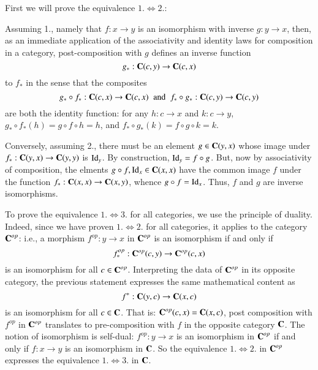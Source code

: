 \documentclass[12pt]{report}
\begin{document}
\begin{proof*}{}{}
    First we will prove the equivalence $1. \iff 2.$:

    Assuming 1., namely that $f:x\rightarrow y$ is an isomorphism with inverse $g:y\rightarrow x$, then, as an immediate application of the associativity and identity laws for composition in a category, post-composition with $g$ defines an inverse function \begin{equation*}
        g_*:\normalfont\textbf{C}(c,y)\rightarrow \normalfont\textbf{C}(c,x)
    \end{equation*}
    to $f_*$ in the sense that the composites \begin{equation*}
        g_*\circ f_*:\normalfont\textbf{C}(c,x)\rightarrow \normalfont\textbf{C}(c,x)\;\;\text{and}\;\;f_*\circ g_*:\normalfont\textbf{C}(c,y)\rightarrow \normalfont\textbf{C}(c,y)
    \end{equation*}
    are both the identity function: for any $h:c\rightarrow x$ and $k:c\rightarrow y$, $g_*\circ f_*(h) = g\circ f\circ h = h$, and $f_*\circ g_*(k) = f\circ g \circ k = k$.

    Conversely, assuming 2., there must be an element $g \in \normalfont\textbf{C}(y,x)$ whose image under $f_*:\normalfont\textbf{C}(y,x)\rightarrow \normalfont\textbf{C}(y,y)$ is $\operatorname{Id}_y$. By construction, $\operatorname{Id}_y = f\circ g$. But, now by associativity of composition, the elments $g\circ f, \operatorname{Id}_x \in \normalfont\textbf{C}(x,x)$ have the common image $f$ under the function $f_*:\normalfont\textbf{C}(x,x)\rightarrow \normalfont\textbf{C}(x,y)$, whence $g\circ f = \operatorname{Id}_x$. Thus, $f$ and $g$ are inverse isomorphisms.

    To prove the equivalence $1.\iff 3.$ for all categories, we use the principle of duality. Indeed, since we have proven $1.\iff 2.$ for all categories, it applies to the category $\normalfont\textbf{C}^{op}$: i.e., a morphism $f^{op}:y\rightarrow x$ in $\normalfont\textbf{C}^{op}$ is an isomorphism if and only if \begin{equation*}
        f_*^{op}:\normalfont\textbf{C}^{op}(c,y)\rightarrow \normalfont\textbf{C}^{op}(c,x)
    \end{equation*}
    is an isomorphism for all $c \in \normalfont\textbf{C}^{op}$. Interpreting the data of $\normalfont\textbf{C}^{op}$ in its opposite category, the previous statement expresses the same mathematical content as \begin{equation*}
        f^*:\normalfont\textbf{C}(y,c)\rightarrow\normalfont\textbf{C}(x,c)
    \end{equation*}
    is an isomorphism for all $c \in \normalfont\textbf{C}$. That is: $\normalfont\textbf{C}^{op}(c,x) = \normalfont\textbf{C}(x,c)$, post composition with $f^{op}$ in $\normalfont\textbf{C}^{op}$ translates to pre-composition with $f$ in the opposite category $\normalfont\textbf{C}$. The notion of isomorphism is self-dual: $f^{op}:y\rightarrow x$ is an isomorphism in $\normalfont\textbf{C}^{op}$ if and only if $f:x\rightarrow y$ is an isomorphism in $\normalfont\textbf{C}$. So the equivalence $1.\iff 2.$ in $\normalfont\textbf{C}^{op}$ expresses the equivalence $1.\iff 3.$ in $\normalfont\textbf{C}$.
\end{proof*}
\end{document}
